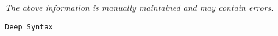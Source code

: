 \label{pkg:deep\_syntax}

{\tiny \it The above information is manually maintained and may contain errors.}
\begin{verbatim}
Deep_Syntax
\end{verbatim}
